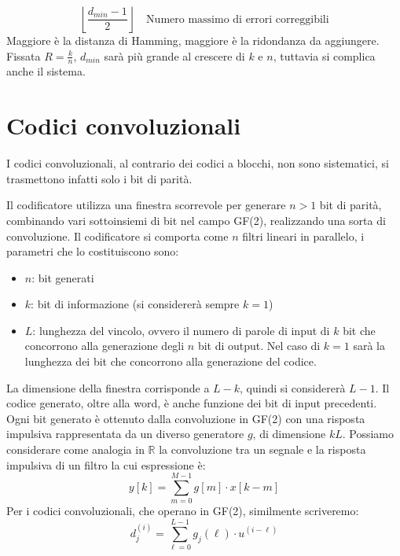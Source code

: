 \[
    \left\lfloor \frac{d_{min} - 1}{2} \right\rfloor \quad \text{Numero massimo di errori correggibili}
\]
Maggiore è la distanza di Hamming, maggiore è la ridondanza da aggiungere.
Fissata $R=\frac{k}{n}$, $d_{min}$ sarà più grande al crescere di $k$ e $n$, tuttavia si complica anche il sistema.
\section*{Codici convoluzionali}
I codici convoluzionali, al contrario dei codici a blocchi, non sono sistematici, si trasmettono infatti solo i bit di parità.

Il codificatore utilizza una finestra scorrevole per generare $n>1$ bit di parità, combinando vari sottoinsiemi di bit nel campo GF(2), realizzando una sorta di convoluzione.
Il codificatore si comporta come $n$ filtri lineari in parallelo, i parametri che lo costituiscono sono:
\begin{itemize}
    \item $n$: bit generati
    \item $k$: bit di informazione (si considererà sempre $k=1$)
    \item $L$: lunghezza del vincolo, ovvero il numero di parole di input di $k$ bit che concorrono alla generazione degli $n$ bit di output. Nel caso di $k=1$ sarà la lunghezza dei bit che concorrono alla generazione del codice.
\end{itemize}

La dimensione della finestra corrisponde a $L-k$, quindi si considererà $L-1$. Il codice generato, oltre alla word, è anche funzione dei bit di input precedenti. Ogni bit generato è ottenuto dalla convoluzione in GF(2) con una risposta impulsiva rappresentata da un diverso generatore $g$, di dimensione $kL$.
Possiamo considerare come analogia in $\mathbb{R}$ la convoluzione tra un segnale e la risposta impulsiva di un filtro la cui espressione è:
\[
    y\left[k\right] = \sum_{m=0}^{M-1} g\left[m\right] \cdot x\left[k-m\right]
\]
Per i codici convoluzionali, che operano in GF(2), similmente scriveremo:
\[
    d_j^{\left(i\right)} = \sum_{\ell=0}^{L-1} g_j\left(\ell\right) \cdot u^{\left( i - \ell \right)}
\]

